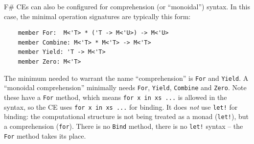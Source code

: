 \documentclass[acmsmall]{acmart}\settopmatter{}
\begin{document}
F\# CEs can also be configured for comprehension (or ``monoidal'') syntax. In this case, the minimal operation signatures are typically this form:
\begin{verbatim}
    member For:  M<'T> * ('T -> M<'U>) -> M<'U>
    member Combine: M<'T> * M<'T> -> M<'T>
    member Yield: 'T -> M<'T>
    member Zero: M<'T>
\end{verbatim}
The minimum needed to warrant the name ``comprehension'' is \texttt{For} and \texttt{Yield}.  A ``monoidal comprehension'' minimally
needs \texttt{For}, \texttt{Yield}, \texttt{Combine} and \texttt{Zero}. 
Note these have a \texttt{For} method, which means \texttt{for x in xs  ...} is allowed in the syntax, so the CE uses \texttt{for x in xs ...} for binding.
It does \emph{not} use \texttt{let!} for binding: the computational structure is not being treated as a monad (\texttt{let!}), but a comprehension (\texttt{for}).
There is no \texttt{Bind} method, there is no \texttt{let!} syntax -- the \texttt{For} method takes its place.  
\end{document}

